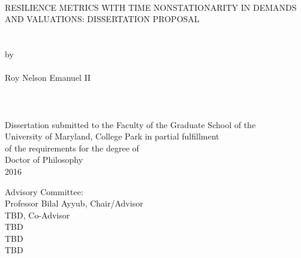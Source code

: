 
\thispagestyle{empty}
\hbox{\ }
\vspace{1in}
\renewcommand{\baselinestretch}{1}
\small\normalsize
\begin{center}

\large{{RESILIENCE METRICS WITH TIME NONSTATIONARITY IN DEMANDS AND
    VALUATIONS: DISSERTATION PROPOSAL}}\\
\ \\
\ \\
\large{by} \\
\ \\
\large{Roy Nelson Emanuel II}%
\ \\
\ \\
\ \\
\ \\
\normalsize
Dissertation submitted to the Faculty of the Graduate School of the \\
University of Maryland, College Park in partial fulfillment \\
of the requirements for the degree of \\
Doctor of Philosophy \\
2016
\end{center}

\vspace{7.5em}

\noindent Advisory Committee: \\
Professor Bilal Ayyub, Chair/Advisor \\
TBD, Co-Advisor \\
TBD \\
TBD \\
TBD
